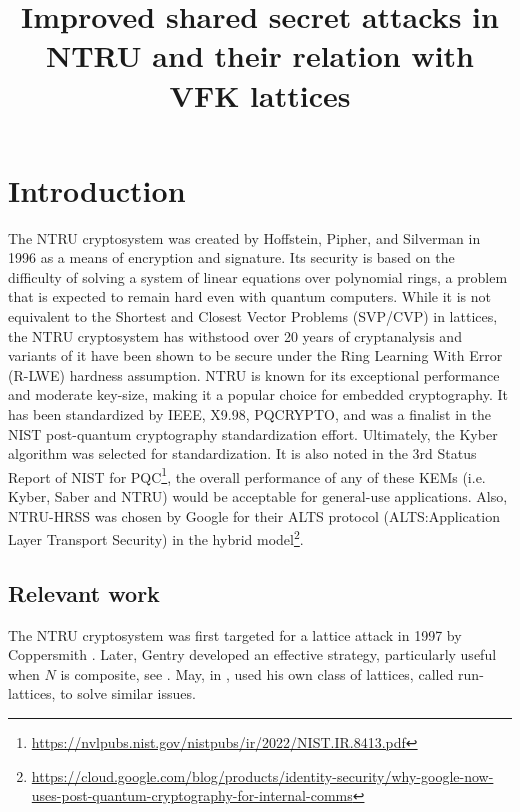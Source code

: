 \documentclass{amsart}
\numberwithin{equation}{section}
\begin{document}
	\title[Improved shared secret attacks in NTRU]{Improved shared secret attacks in NTRU and their relation with VFK lattices}
\maketitle	
	\begin{abstract}
		\end{abstract}
\section{Introduction}
The NTRU cryptosystem was created by Hoffstein, Pipher, and Silverman in 1996 as a means of encryption and signature. Its security is based on the difficulty of solving a system of linear equations over polynomial rings, a problem that is expected to remain hard even with quantum computers. While it is not equivalent to the Shortest and Closest Vector Problems (SVP/CVP) in lattices, the NTRU cryptosystem has withstood over 20 years of cryptanalysis and variants of it have been shown to be secure under the Ring Learning With Error (R-LWE) hardness assumption. NTRU is known for its exceptional performance and moderate key-size, making it a popular choice for embedded cryptography. It has been standardized by IEEE, X9.98, PQCRYPTO, and was a finalist in the NIST post-quantum cryptography standardization effort. Ultimately, the Kyber algorithm was selected for standardization. It is also noted in the  3rd Status Report of NIST for PQC\footnote{\url{https://nvlpubs.nist.gov/nistpubs/ir/2022/NIST.IR.8413.pdf}}, the overall performance of any of these KEMs (i.e. Kyber, Saber and NTRU) would be acceptable for general-use applications. Also, NTRU-HRSS was chosen by Google for their ALTS protocol (ALTS:Application Layer Transport Security) in the hybrid model\footnote{\url{https://cloud.google.com/blog/products/identity-security/why-google-now-uses-post-quantum-cryptography-for-internal-comms}}.

\subsection{Relevant work}

The NTRU cryptosystem was first targeted for a lattice attack in 1997 by Coppersmith \cite{CopSha97}. Later, Gentry developed an effective strategy, particularly useful when $N$ is composite, see \cite{gentry}. May, in \cite{May}, used his own class of lattices, called run-lattices, to solve similar issues. 
\end{document}
